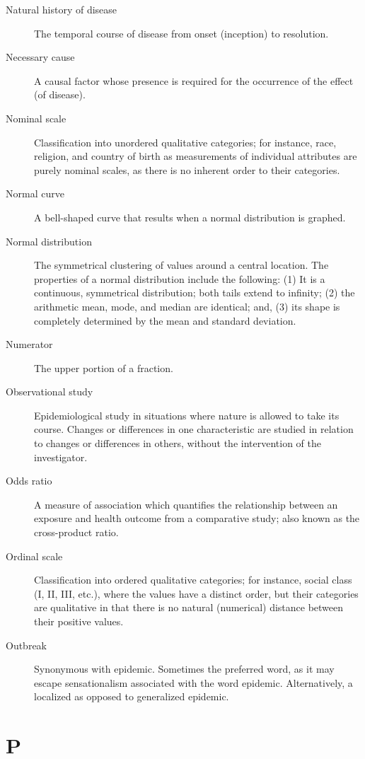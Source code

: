\documentclass[11pt]{article}
\begin{document}
\begin{description}
\item[Natural history of disease] The temporal course of disease
from onset (inception) to resolution.
\item[Necessary cause] A causal factor whose presence is required
for the occurrence of the effect (of disease).
\item[Nominal scale] Classification into unordered qualitative
categories; for instance, race, religion, and country of birth as
measurements of individual attributes are purely nominal scales,
as there is no inherent order to their categories.
\item[Normal curve] A bell-shaped curve that results when a
normal distribution is graphed.
\item[Normal distribution] The symmetrical clustering of values
around a central location. The properties of a normal
distribution include the following: (1) It is a continuous,
symmetrical distribution; both tails extend to infinity; (2) the
arithmetic mean, mode, and median are identical; and, (3) its
shape is completely determined by the mean and standard
deviation.
\item[Numerator] The upper portion of a fraction.
\item[Observational study] Epidemiological study in situations
where nature is allowed to take its course. Changes or
differences in one characteristic are studied in relation to
changes or differences in others, without the intervention of
the investigator.
\item[Odds ratio] A measure of association which quantifies the
relationship between an exposure and health outcome from a
comparative study; also known as the cross-product ratio.
\item[Ordinal scale] Classification into ordered qualitative
categories; for instance, social class (I, II, III, etc.), where
the values have a distinct order, but their categories are
qualitative in that there is no natural (numerical) distance
between their positive values.
\item[Outbreak] Synonymous with epidemic. Sometimes the preferred
word, as it may escape sensationalism associated with the word
epidemic. Alternatively, a localized as opposed to generalized
epidemic.
\end{description}

\section*{P}
\end{document}
